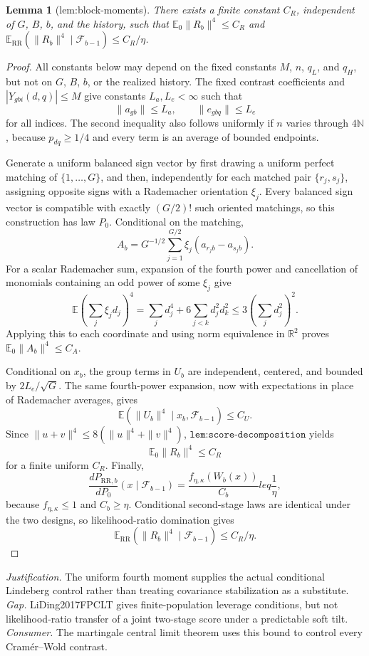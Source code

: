 \documentclass{article}
\newtheorem{lemma}{Lemma}
\begin{document}
\begin{lemma}[lem:block-moments]\label{lem:block-moments}
There exists a finite constant \(C_R\), independent of \(G\), \(B\), \(b\), and the history, such that \(\mathbb E_0\|R_b\|^4\leq C_R\) and \(\mathbb E_{\mathrm{RR}}(\|R_b\|^4\mid\mathcal F_{b-1})\leq C_R/\eta\).
\end{lemma}
\begin{proof}
All constants below may depend on the fixed constants \(M\), \(n\), \(q_L\), and \(q_H\), but not on \(G\), \(B\), \(b\), or the realized history.  The fixed contrast coefficients and \(|Y_{gbi}(d,q)|\leq M\) give constants \(L_a,L_e<\infty\) such that
\[
 \|a_{gb}\|\leq L_a,
 \qquad \|e_{gbq}\|\leq L_e
\]
for all indices.  The second inequality also follows uniformly if \(n\) varies through \(4\mathbb N\), because \(p_{dq}\geq1/4\) and every term is an average of bounded endpoints.

Generate a uniform balanced sign vector by first drawing a uniform perfect matching of \(\{1,\ldots,G\}\), and then, independently for each matched pair \(\{r_j,s_j\}\), assigning opposite signs with a Rademacher orientation \(\xi_j\).  Every balanced sign vector is compatible with exactly \((G/2)!\) such oriented matchings, so this construction has law \(P_0\).  Conditional on the matching,
\[
 A_b=G^{-1/2}\sum_{j=1}^{G/2}\xi_j(a_{r_jb}-a_{s_jb}).
\]
For a scalar Rademacher sum, expansion of the fourth power and cancellation of monomials containing an odd power of some \(\xi_j\) give
\[
 \mathbb E\left(\sum_j\xi_jd_j\right)^4
 =\sum_jd_j^4+6\sum_{j<k}d_j^2d_k^2
 \leq3\left(\sum_jd_j^2\right)^2.
\]
Applying this to each coordinate and using norm equivalence in \(\mathbb R^2\) proves \(\mathbb E_0\|A_b\|^4\leq C_A\).

Conditional on \(x_b\), the group terms in \(U_b\) are independent, centered, and bounded by \(2L_e/\sqrt G\).  The same fourth-power expansion, now with expectations in place of Rademacher averages, gives
\[
 \mathbb E(\|U_b\|^4\mid x_b,\mathcal F_{b-1})\leq C_U.
\]
Since \(\|u+v\|^4\leq8(\|u\|^4+\|v\|^4)\), \(\texttt{lem:score-decomposition}\) yields
\[
 \mathbb E_0\|R_b\|^4\leq C_R
\]
for a finite uniform \(C_R\).  Finally,
\[
 \frac{dP_{\mathrm{RR},b}}{dP_0}(x\mid\mathcal F_{b-1})
 =\frac{f_{\eta,\kappa}(W_b(x))}{C_b}leq\frac1\eta,
\]
because \(f_{\eta,\kappa}\leq1\) and \(C_b\geq\eta\).  Conditional second-stage laws are identical under the two designs, so likelihood-ratio domination gives
\[
 \mathbb E_{\mathrm{RR}}(\|R_b\|^4\mid\mathcal F_{b-1})
 \leq C_R/\eta.
\]
\end{proof}
\par\smallskip\noindent \textit{Justification.} The uniform fourth moment supplies the actual conditional Lindeberg control rather than treating covariance stabilization as a substitute. \textit{Gap.} LiDing2017FPCLT gives finite-population leverage conditions, but not likelihood-ratio transfer of a joint two-stage score under a predictable soft tilt. \textit{Consumer.} The martingale central limit theorem uses this bound to control every Cram\'er--Wold contrast.
\end{document}

